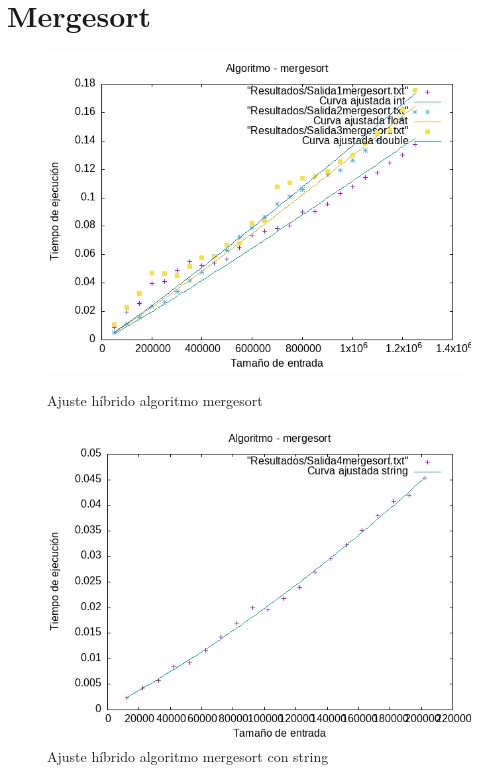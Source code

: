 \documentclass[11pt,openany]{book}
\begin{document}
\section*{Mergesort}
\begin{figure}[H]
    \begin{minipage}{0.5\textwidth}
        \centering
        \includegraphics[width=\linewidth]{assets/AjusteHibrido_latex/Hibridomergesort/mergesort_hib.png}
        \caption{Ajuste híbrido algoritmo mergesort}
        \label{fig:mergesort}
    \end{minipage}%
    \begin{minipage}{0.5\textwidth}
        \centering
        \includegraphics[width=\linewidth]{assets/AjusteHibrido_latex/Hibridomergesort/mergesortstring_hib.png}
        \caption{Ajuste híbrido algoritmo mergesort con string}
        \label{fig:mergesort}
    \end{minipage}
\end{figure}
\end{document}
